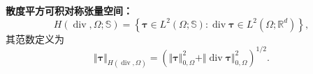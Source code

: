 \noindent\textbf{散度平方可积对称张量空间：}
\[
H(\operatorname{div},\Omega;\mathbb{S})
=
\left\{
\boldsymbol{\tau}\in L^2(\Omega;\mathbb{S}) :
\operatorname{div}\boldsymbol{\tau}\in L^2(\Omega;\mathbb{R}^d)
\right\},
\]
\noindent 其范数定义为
\[
\Vert\boldsymbol{\tau}\Vert_{H(\operatorname{div},\Omega)}
=
\left(
\Vert\boldsymbol{\tau}\Vert^2_{0,\Omega}
+
\Vert\operatorname{div}\boldsymbol{\tau}\Vert^2_{0,\Omega}
\right)^{1/2}.
\]

%	
%	
%	
%	
%	
%	


